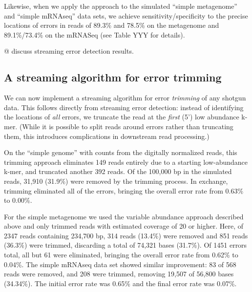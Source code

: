 \documentclass{article}
\begin{document}

Likewise, when we apply the approach to the simulated ``simple
metagenome'' and ``simple mRNAseq'' data sets, we achieve
sensitivity/specificity to the precise locations of errors in reads of
89.3\% and 78.5\% on the metagenome and 89.1\%/73.4\% on the mRNASeq
(see Table YYY for details).

@ discuss streaming error detection results.

\subsection{A streaming algorithm for error trimming}

We can now implement a streaming algorithm for error {\em trimming} of
any shotgun data.  This follows directly from streaming error
detection: instead of identifying the locations of {\em all} errors,
we truncate the read at the {\em first} (5') low abundance k-mer.
(While it is possible to split reads around errors rather than
truncating them, this introduces complications in downstream read
processing.)

On the ``simple genome'' with counts from the digitally normalized reads,
this trimming approach eliminates 149 reads entirely due to a starting
low-abundance k-mer, and truncated another 392 reads.  Of the 100,000
bp in the simulated reads, 31,910 (31.9\%) were removed by the
trimming process.  In exchange, trimming eliminated all of the errors,
bringing the overall error rate from 0.63\% to 0.00\%.

For the simple metagenome we used the variable abundance approach
described above and only trimmed reads with estimated coverage of 20
or higher.  Here, of 2347 reads containing 234,700 bp, 314 reads
(13.4\%) were removed and 851 reads (36.3\%) were trimmed, discarding
a total of 74,321 bases (31.7\%).  Of 1451 errors total, all but 61
were eliminated, bringing the overall error rate from 0.62\% to
0.04\%.  The simple mRNAseq data set showed similar improvement: 83 of
568 reads were removed, and 208 were trimmed, removing 19,507 of
56,800 bases (34.34\%).  The initial error rate was 0.65\% and the
final error rate was 0.07\%.
\end{document}
